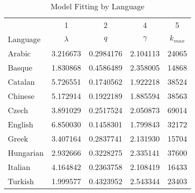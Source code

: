 \documentclass[12pt, a4paper]{article}
\begin{document}
\begin{table}[H]
\centering
    \begin{tabular}{l c c c c}
             & 1 & 2 & 4 & 5\\
    Language & $\lambda$ & $q$ & $\gamma$ & $k_{max}$\\
     \hline
     Arabic    & 3.216673 & 0.2984176 & 2.104113 & 24065 \\
     Basque    & 1.830868 & 0.4586489 & 2.358005 & 14868 \\
     Catalan   & 5.726551 & 0.1740562 & 1.922218 & 38524 \\
     Chinese   & 5.172914 & 0.1922189 & 1.885594 & 38563 \\
     Czech     & 3.891029 & 0.2517524 & 2.050873 & 69014 \\
     English   & 6.850030 & 0.1458301 & 1.799843 & 32172 \\
     Greek     & 3.407164 & 0.2837741 & 2.131930 & 15704 \\
     Hungarian & 2.932666 & 0.3228275 & 2.335141 & 37600 \\
     Italian   & 4.164842 & 0.2363758 & 2.108419 & 16433 \\
     Turkish   & 1.999577 & 0.4323952 & 2.543344 & 23403 
    \end{tabular}
   \caption{Model Fitting by Language}
   \label{table:3}
\end{table}
\end{document}
